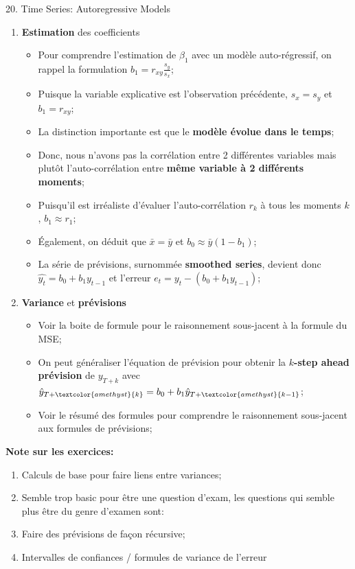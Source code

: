 \documentclass[12pt, titlepage, french]{report}
\begin{document}
\begin{CHPT_SUMM}[label = {timeseries20}]{20. Time Series: Autoregressive Models}
\begin{enumerate}
\begin{itemize}
\begin{align*}
		\end{align*}
		\setlength{\mathindent}{1cm}
		\end{itemize}
	\item[]	\textbf{Estimation} des coefficients
		\begin{itemize}
		\item	Pour comprendre l'estimation de $\beta_{1}$ avec un modèle auto-régressif, on rappel la formulation $b_{1} = r_{xy} \frac{s_{y}}{s_{x}}$;
		\item[]	Puisque la variable explicative est l'observation précédente, $s_{x} = s_{y}$ et $b_{1} = r_{xy}$;
		\item[]	La distinction importante est que le \textbf{modèle évolue dans le temps};
		\item[] Donc, nous n'avons pas la corrélation entre 2 différentes variables mais plutôt l'auto-corrélation entre \textbf{même variable à 2 différents moments};
		\item	Puisqu'il est irréaliste d'évaluer l'auto-corrélation $r_{k}$ à tous les moments $k$, $b_{1} \approx r_{1}$;
		\item	Également, on déduit que $\bar{x} = \bar{y}$ et $b_{0} \approx \bar{y} (1 - b_{1})$;
		\item	La série de prévisions, surnommée \textbf{smoothed series}, devient donc $\hat{y_{t}} = b_{0} + b_{1} y_{t - 1}$ et l'erreur $e_{t} = y_{t} - (b_{0} + b_{1} y_{t - 1})$;
		\end{itemize}
	\item[]	\textbf{Variance} et \textbf{prévisions}
		\begin{itemize}
		\item	Voir la boite de formule pour le raisonnement sous-jacent à la formule du MSE;
		\item	On peut généraliser l'équation de prévision pour obtenir la \textbf{\textcolor{amethyst}{$k$-step ahead} prévision} de $y_{T + k}$ avec $\hat{y}_{T + \textcolor{amethyst}{k}} = b_{0} + b_{1} \hat{y}_{T + \textcolor{amethyst}{k - 1}}$;
		\item	Voir le résumé des formules pour comprendre le raisonnement sous-jacent aux formules de prévisions;
		\end{itemize}
\end{enumerate}
\textbf{Note sur les exercices:} 
\begin{enumerate}
	\item	Calculs de base pour faire liens entre variances;
	\item[]	Semble trop basic pour être une question d'exam, les questions qui semble plus être du genre d'examen sont:
	\item	Faire des prévisions de façon récursive;
	\item	Intervalles de confiances / formules de variance de l'erreur	
\end{enumerate}
\end{CHPT_SUMM}
\end{document}
